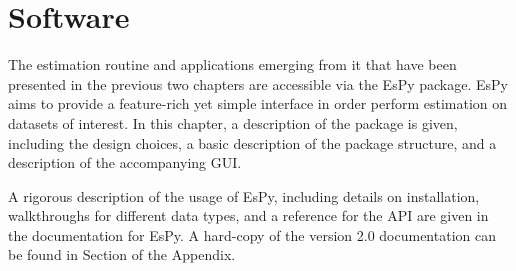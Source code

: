 \chapter{Software}
\label{chap:nmrespy}

The estimation routine and applications emerging from it that have been
presented in the previous two chapters are accessible via the \ac{EsPy}
package. \ac{EsPy} aims to provide a feature-rich yet simple interface in order
perform estimation on datasets of interest. In this chapter, a description of
the package is given, including the design choices, a basic description of the
package structure, and a description of the accompanying \ac{GUI}.

A rigorous description of the usage of \ac{EsPy}, including details on
installation, walkthroughs for different data types, and a reference for the
\ac{API} are given in the documentation for \ac{EsPy}. A hard-copy of the
version 2.0 documentation can be found in Section  of the Appendix.


